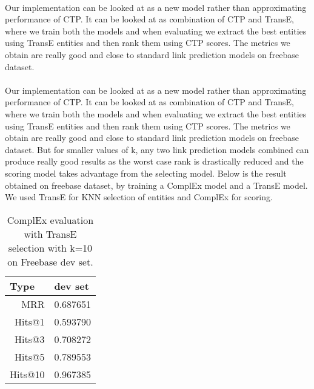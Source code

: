 \documentclass[Other]{iitddiss}
\begin{document}
\paragraph{}
Our implementation can be looked at as a new model rather than approximating performance of CTP. It can be looked at as combination of CTP and TransE, where we train both the models and when evaluating we extract the best entities using TransE entities and then rank them using CTP scores. The metrics we obtain are really good and close to standard link prediction models on freebase dataset.





\paragraph{}
Our implementation can be looked at as a new model rather than approximating performance of CTP. It can be looked at as combination of CTP and TransE, where we train both the models and when evaluating we extract the best entities using TransE entities and then rank them using CTP scores. The metrics we obtain are really good and close to standard link prediction models on freebase dataset. But for smaller values of k, any two link prediction models combined can produce really good results as the worst case rank is drastically reduced and the scoring model takes advantage from the selecting model. Below is the result obtained on freebase dataset, by training a ComplEx model and a TransE model. We used TransE for KNN selection of entities and ComplEx for scoring.

\begin{table}[H]
	\centering
	\begin{tabular}{|r|r|}
		\hline
		\multicolumn{1}{|l|}{\textbf{Type}} & \multicolumn{1}{l|}{\textbf{dev set}}  \\ \hline
		MRR		&	0.687651                              \\ \hline
		Hits@1	&	0.593790                              \\ \hline
		Hits@3	&	0.708272                              \\ \hline
		Hits@5	&	0.789553                              \\ \hline
		Hits@10	&	0.967385                              \\ \hline
	\end{tabular}
	\caption{ComplEx evaluation with TransE selection with k=10 on Freebase dev set. }
	\label{tab:transE_MRR}
\end{table}
\end{document}
